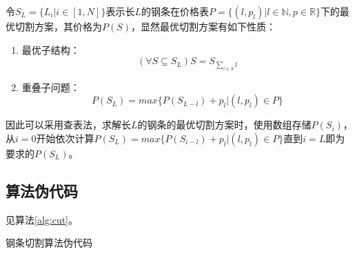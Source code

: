令$S_{L}=\{L_i|i\in[1,N]\}$表示长$L$的钢条在价格表$P=\{(l,p_l)|l\in\mathbb{N},p\in\mathbb{R}\}$下的最优切割方案，其价格为$P(S)$，显然最优切割方案有如下性质：

\begin{enumerate}
    \item 最优子结构：$$(\forall S\subseteq S_{L})S=S_{\sum_{l\in S}l}$$
    \item 重叠子问题：$$P(S_L)=max\{P(S_{L-l})+p_l|(l,p_l)\in P\}$$
\end{enumerate}

因此可以采用查表法，求解长$L$的钢条的最优切割方案时，使用数组存储$P(S_i)$，从$i=0$开始依次计算$P(S_L)=max\{P(S_{i-l})+p_l|(l,p_l)\in P\}$直到$i=L$即为要求的$P(S_L)$。

\subsection{算法伪代码}
见算法\ref{alg:cut}。
\begin{algorithm}[htbp]
\caption{钢条切割算法伪代码}\label{alg:cut}
\end{algorithm}